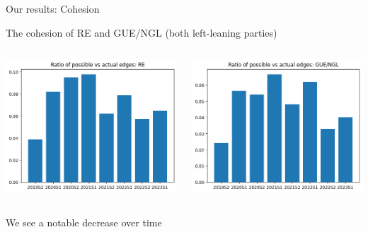 \documentclass{beamer}
\begin{document}
\begin{frame}{Our results: Cohesion}
	
	The cohesion of RE and GUE/NGL (both left-leaning parties)
	
	\pause
	
	\vspace{0.5cm}
	
	\begin{columns}
		
		\begin{column}{0.4\textwidth}
			\includegraphics[width=\textwidth]{img/coh_re.png}
		\end{column}
		
		\begin{column}{0.4\textwidth}
			\includegraphics[width=\textwidth]{img/coh_guengl.png}
		\end{column}
			
	\end{columns}
	
	\vspace{0.5cm}
	
	\pause We see a notable decrease over time
\end{frame}
\end{document}
